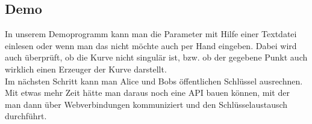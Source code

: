 \subsection*{Demo}
In unserem Demoprogramm kann man die Parameter mit Hilfe einer Textdatei einlesen oder wenn man das nicht möchte auch per Hand eingeben. Dabei wird auch überprüft, ob die Kurve nicht singulär ist, bzw. ob der gegebene Punkt auch wirklich einen Erzeuger der Kurve darstellt.\\
Im nächsten Schritt kann man Alice und Bobs öffentlichen Schlüssel ausrechnen. Mit etwas mehr Zeit hätte man daraus noch eine API bauen können, mit der man dann über Webverbindungen kommuniziert und den Schlüsselaustausch durchführt.